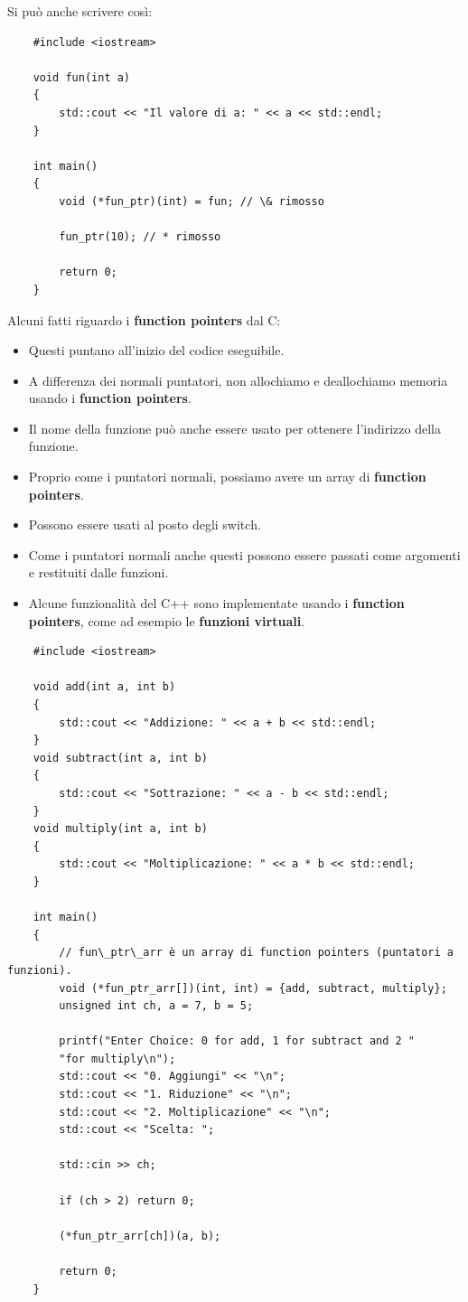\textsf{\small Si può anche scrivere così: } \\

\begin{lstlisting}
	#include <iostream>
	
	void fun(int a)
	{
		std::cout << "Il valore di a: " << a << std::endl;
	}
	
	int main()
	{
		void (*fun_ptr)(int) = fun; // \& rimosso
		
		fun_ptr(10); // * rimosso
		
		return 0;
	}
\end{lstlisting}

\textsf{\small Alcuni fatti riguardo i \textbf{function pointers} dal C: } \\

\begin{itemize}
	\item \textsf{\small Questi puntano all'inizio del codice eseguibile.}
	\item \textsf{\small A differenza dei normali puntatori, non allochiamo e deallochiamo memoria usando i \textbf{function pointers}.}
	\item \textsf{\small Il nome della funzione può anche essere usato per ottenere l'indirizzo della funzione.}
	\item \textsf{\small Proprio come i puntatori normali, possiamo avere un array di \textbf{function pointers}.}
	\item \textsf{\small Possono essere usati al posto degli switch.}
	\item \textsf{\small Come i puntatori normali anche questi possono essere passati come argomenti e restituiti dalle funzioni.}
	\item \textsf{\small Alcune funzionalità del C++ sono implementate usando i \textbf{function pointers}, come ad esempio le \textbf{funzioni virtuali}.}
\end{itemize}

\begin{lstlisting}
	#include <iostream>
	
	void add(int a, int b)
	{
		std::cout << "Addizione: " << a + b << std::endl;
	}
	void subtract(int a, int b)
	{
		std::cout << "Sottrazione: " << a - b << std::endl;
	}
	void multiply(int a, int b)
	{
		std::cout << "Moltiplicazione: " << a * b << std::endl;
	}
	
	int main()
	{
		// fun\_ptr\_arr è un array di function pointers (puntatori a funzioni).
		void (*fun_ptr_arr[])(int, int) = {add, subtract, multiply};
		unsigned int ch, a = 7, b = 5;
		
		printf("Enter Choice: 0 for add, 1 for subtract and 2 "
		"for multiply\n");
		std::cout << "0. Aggiungi" << "\n";
		std::cout << "1. Riduzione" << "\n";
		std::cout << "2. Moltiplicazione" << "\n";
		std::cout << "Scelta: ";
		
		std::cin >> ch;
		
		if (ch > 2) return 0;
		
		(*fun_ptr_arr[ch])(a, b);
		
		return 0;
	}
\end{lstlisting}


